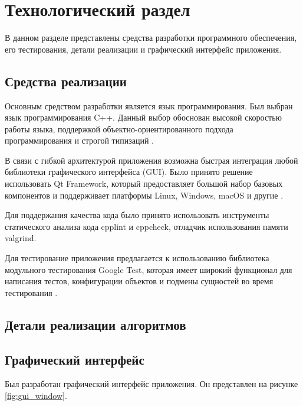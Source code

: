 \chapter{Технологический раздел}
\label{cha:impl}
В данном разделе представлены средства разработки программного
обеспечения, его тестирования, детали реализации и графический интерфейс приложения.

\section{Средства реализации}

Основным средством разработки является язык программирования. Был выбран язык программирования C++. Данный выбор обоснован высокой скоростью работы языка, поддержкой объектно-ориентированного подхода программирования и строгой типизаций \cite{cpplang}. 

В связи с гибкой архитектурой приложения возможна быстрая интеграция любой библиотеки графического интерфейса (GUI). Было принято решение использовать Qt Framework, который предоставляет большой набор базовых компонентов и поддерживает платформы Linux, Windows, macOS и другие \cite{qt_widgets}. 

Для поддержания качества кода было принято использовать инструменты статического анализа кода cpplint\cite{cpplint} и cppcheck\cite{cppcheck}, отладчик использования памяти valgrind\cite{valgrind}. 

Для тестирование приложения предлагается к использованию библиотека модульного тестирования Google Test, которая имеет широкий функционал для написания тестов, конфигурации объектов и подмены сущностей во время тестирования \cite{googletest}.

\section{Детали реализации алгоритмов}




\section{Графический интерфейс}

Был разработан графический интерфейс приложения. Он представлен на рисунке \ref{fig:gui_window}. 


